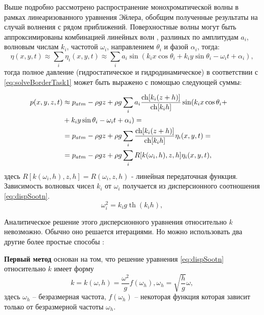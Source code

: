 Выше подробно рассмотрено распространение монохроматической волны в рамках линеаризованного уравнения Эйлера, обобщим полученные результаты на случай волнения с рядом приближений. Поверхностные волны могут быть аппроксимированы комбинацией линейных волн \cite{longeHigg}, разлиных по амплитудам $a_i$, волновым числам $k_i$, частотой $\omega_i$, направлением $\theta_i$ и фазой $\alpha_i$, тогда:
\begin{equation}\label{eq:approx}
    \eta(x,y,t)\approx\sum\limits_i\eta_i(x,y,t)\approx
    \sum\limits_i a_i\sin(k_ix\cos\theta_i+k_iy\sin\theta_i-\omega_i t+\alpha_i),
\end{equation}
\noindent
тогда полное давление (гидростатическое и гидродинамическое) в соответствии с \eqref{eq:solveBorderTask1}  может быть выражено с помощью следующей суммы:

\begin{align}\label{eq:approxPress}
    p(x,y,z,t) &\approx p_{atm}-\rho gz+\rho g \sum\limits_i a_i\frac{\operatorname{ch}[k_i(z+h)]}{\operatorname{ch}[k_ih]}\sin(k_ix\cos\theta_i+&\notag\\
    &+k_iy\sin\theta_i-\omega_i t+\alpha_i)=&\notag\\
    &=p_{atm}-\rho gz+\rho g\sum\limits_i\frac{\operatorname{ch}[k_i(z+h)]}{\operatorname{ch}[k_ih]}\eta_i(x,y,t)=&\\
    &=p_{atm}-\rho gz+\rho g\sum\limits_iR[k(\omega_i,h),z,h]\eta_i(x,y,t),&
\end{align}
\noindent
здесь $R[k(\omega_i,h),z,h]=R(\omega_i,z,h)$ - линейная передаточная функция. Зависимость волновых чисел $k_i$ от $\omega_i$ получается из дисперсионного соотношения \eqref{eq:dispSootn}.
\begin{equation}\label{eq:dispSootn1}
\omega_i^2=k_ig\operatorname{th}(k_ih),
\end{equation}

Аналитическое решение этого дисперсионного уравнения относительно $k$ невозможно. Обычно оно решается итерациями. Но можно использовать два другие более простые способы\cite{kras} \cite{Zasl_Kras_2001}:

\textbf{Первый метод} основан на том, что решение уравнения \eqref{eq:dispSootn} относительно $k$ имеет форму
\begin{equation}\label{eq:dispRel_Solve1}
  k=k(\omega,h)=\frac{\omega^2}{g}f(\omega_h), \omega_h=\sqrt{\frac{h}{g}}\omega,
\end{equation}
здесь $\omega_h$ -- безразмерная частота, $f(\omega_h)$ -- некоторая функция которая зависит только от безразмерной частоты $\omega_h$.

